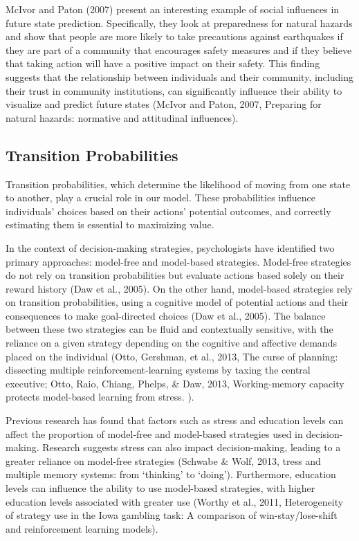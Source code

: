 \documentclass[
]{report}
\begin{document}
McIvor and Paton (2007) present an interesting example of social
influences in future state prediction. Specifically, they look at
preparedness for natural hazards and show that people are more likely to
take precautions against earthquakes if they are part of a community
that encourages safety measures and if they believe that taking action
will have a positive impact on their safety. This finding suggests that
the relationship between individuals and their community, including
their trust in community institutions, can significantly influence their
ability to visualize and predict future states (McIvor and Paton, 2007,
Preparing for natural hazards: normative and attitudinal influences).

\hypertarget{transition-probabilities}{%
\subsection{Transition Probabilities}\label{transition-probabilities}}

Transition probabilities, which determine the likelihood of moving from
one state to another, play a crucial role in our model. These
probabilities influence individuals' choices based on their actions'
potential outcomes, and correctly estimating them is essential to
maximizing value.

In the context of decision-making strategies, psychologists have
identified two primary approaches: model-free and model-based
strategies. Model-free strategies do not rely on transition
probabilities but evaluate actions based solely on their reward history
(Daw et al., 2005). On the other hand, model-based strategies rely on
transition probabilities, using a cognitive model of potential actions
and their consequences to make goal-directed choices (Daw et al., 2005).
The balance between these two strategies can be fluid and contextually
sensitive, with the reliance on a given strategy depending on the
cognitive and affective demands placed on the individual (Otto,
Gershman, et al., 2013, The curse of planning: dissecting multiple
reinforcement-learning systems by taxing the central executive; Otto,
Raio, Chiang, Phelps, \& Daw, 2013, Working-memory capacity protects
model-based learning from stress. ).

Previous research has found that factors such as stress and education
levels can affect the proportion of model-free and model-based
strategies used in decision-making. Research suggests stress can also
impact decision-making, leading to a greater reliance on model-free
strategies (Schwabe \& Wolf, 2013, tress and multiple memory systems:
from `thinking' to `doing'). Furthermore, education levels can influence
the ability to use model-based strategies, with higher education levels
associated with greater use (Worthy et al., 2011, Heterogeneity of
strategy use in the Iowa gambling task: A comparison of
win-stay/lose-shift and reinforcement learning models).
\end{document}
